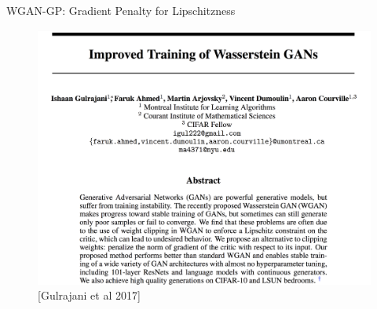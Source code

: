 \begin{frame}[allowframebreaks]{WGAN-GP: Gradient Penalty for Lipschitzness}
\begin{figure}
    \centering
    \includegraphics[height=0.8\textheight, width=\textwidth, keepaspectratio]{images/gan/wgan-gp/slide_84_1_img.png}
    \caption*{[Gulrajani et al 2017]}
\end{figure}


\end{frame}
